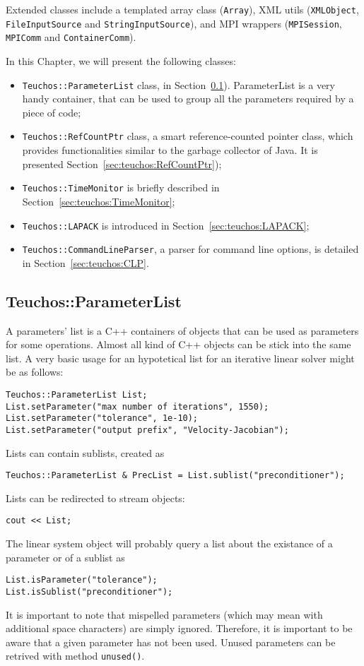 Extended classes include a templated array class
(\verb!Array!), XML utils ({\tt XMLObject},
{\tt FileInputSource} and {\tt StringInputSource}),
and MPI wrappers (\verb!MPISession!, \verb!MPIComm!
and \verb!ContainerComm!).

\medskip

In this Chapter, we will present the following classes:
\begin{itemize}
\item \verb!Teuchos::ParameterList! class, in
  Section~\ref{sec:teuchos:ParameterList}). ParameterList is a very
  handy container, that can be used to group all the parameters required
  by a piece of code;
\item \verb!Teuchos::RefCountPtr! class, a smart reference-counted
  pointer class, which provides functionalities similar to the garbage
  collector of Java. It is presented
  Section~\ref{sec:teuchos:RefCountPtr});
\item \verb!Teuchos::TimeMonitor! is briefly described in
  Section~\ref{sec:teuchos:TimeMonitor};
\item \verb!Teuchos::LAPACK! is introduced in
  Section~\ref{sec:teuchos:LAPACK};
\item \verb!Teuchos::CommandLineParser!, a parser for command line
  options, is detailed in Section~\ref{sec:teuchos:CLP}.
\end{itemize}


\subsection{Teuchos::ParameterList}
\label{sec:teuchos:ParameterList}

A parameters' list is a C++ containers of objects that can be used as
parameters for some operations. Almost all kind of C++ objects can be
stick into the same list. A very basic usage for an hypotetical list for
an iterative linear solver might be as follows:
\begin{verbatim}
Teuchos::ParameterList List;
List.setParameter("max number of iterations", 1550);
List.setParameter("tolerance", 1e-10);
List.setParameter("output prefix", "Velocity-Jacobian");
\end{verbatim}
Lists can contain sublists, created as 
\begin{verbatim}
Teuchos::ParameterList & PrecList = List.sublist("preconditioner");
\end{verbatim}
Lists can be redirected to stream objects:
\begin{verbatim}
cout << List;
\end{verbatim}
The linear system object will probably query a list about the existance
of a parameter or of a sublist as
\begin{verbatim}
List.isParameter("tolerance");
List.isSublist("preconditioner");
\end{verbatim}
It is important to note that mispelled parameters (which may mean with
additional space characters) are simply ignored. Therefore, it is
important to be aware that a given parameter has not been used. Unused
parameters can be retrived with method \verb!unused()!.

